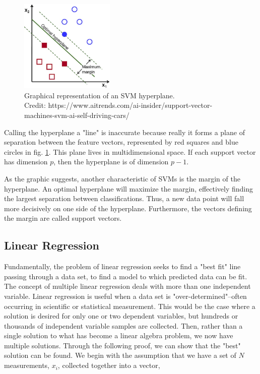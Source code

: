 \documentclass[11pt,a4paper]{article}
\begin{document}
\begin{figure}
\centering
\includegraphics[width=0.4\textwidth]{svm}
\caption{Graphical representation of an SVM hyperplane. \\Credit: https://www.aitrends.com/ai-insider/support-vector-machines-svm-ai-self-driving-cars/}
\label{fig:svm}
\end{figure}

Calling the hyperplane a "line" is inaccurate because really it forms a plane of separation between the feature vectors, represented by red squares and blue circles in fig. \ref{fig:svm}. This plane lives in multidimensional space. If each support vector has dimension $p$, then the hyperplane is of dimension $p-1$. 

As the graphic suggests, another characteristic of SVMs is the margin of the hyperplane. An optimal hyperplane will maximize the margin, effectively finding the largest separation between classifications. Thus, a new data point will fall more decisively on one side of the hyperplane. Furthermore, the vectors defining the margin are called support vectors.

\subsection{Linear Regression}
Fundamentally, the problem of linear regression seeks to find a "best fit" line passing through a data set, to find a model to which predicted data can be fit. The concept of multiple linear regression deals with more than one independent variable. Linear regression is useful when a data set is "over-determined"--often occurring in scientific or statistical measurement. This would be the case where a solution is desired for only one or two dependent variables, but hundreds or thousands of independent variable samples are collected. Then, rather than a single solution to what has become a linear algebra problem, we now have multiple solutions. Through the following proof, we can show that the "best" solution can be found.
We begin with the assumption that we have a set of $N$ measurements, $x_i$, collected together into a vector,
\end{document}
